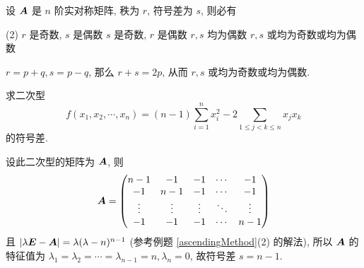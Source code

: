 \begin{example}
    设 $\vb*{A}$ 是 $n$ 阶实对称矩阵, 秩为 $r$, 符号差为 $s$, 则必有
    \begin{tasks}(2)
        \task $r$ 是奇数, $s$ 是偶数
        \task $s$ 是奇数, $r$ 是偶数
        \task $r,s$ 均为偶数
        \task $r,s$ 或均为奇数或均为偶数
    \end{tasks}
\end{example}
\begin{solution}
    $r=p+q,s=p-q$, 那么 $r+s=2p$, 从而 $r,s$ 或均为奇数或均为偶数.
\end{solution}

\begin{example}
    求二次型 $$\displaystyle f(x_1,x_2,\cdots,x_n)=(n-1)\sum_{i=1}^{n}x_i^2-2\sum_{1\leqslant j<k\leqslant n}x_jx_k$$
    的符号差.
\end{example}
\begin{solution}
    设此二次型的矩阵为 $\vb*{A}$, 则 $$\vb*{A}=\mqty(n-1&-1&-1&\cdots&-1\\-1&n-1&-1&\cdots&-1\\\vdots& \vdots& \vdots& \ddots & \vdots\\-1&-1&-1&\cdots&n-1)$$
    且 $|\lambda\vb*{E}-\vb*{A}|=\lambda(\lambda-n)^{n-1}$ (参考例题 \ref{ascendingMethod}(2) 的解法), 所以 $\vb*{A}$ 的特征值为 $\lambda_1=\lambda_2=\cdots=\lambda_{n-1}=n,\lambda_n=0$, 故符号差 $s=n-1.$
\end{solution}

